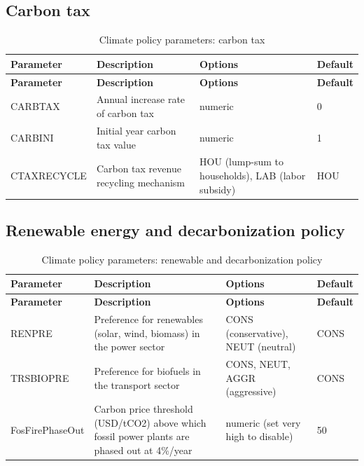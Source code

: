 \documentclass[10pt,a4paper,titlepage,dvipdfmx]{book}
\begin{document}
\subsection{Carbon tax}
\begin{longtable}{|p{}|p{}|p{}|p{}|}
\caption{Climate policy parameters: carbon tax}\label{tab:sp-clp-ctax}\\
\hline
\textbf{Parameter} & \textbf{Description} & \textbf{Options} & \textbf{Default} \\ \hline
\endfirsthead
\hline
\textbf{Parameter} & \textbf{Description} & \textbf{Options} & \textbf{Default} \\ \hline
\endhead
\hline
\endfoot
CARBTAX & Annual increase rate of carbon tax & numeric & 0 \\ \hline
CARBINI & Initial year carbon tax value & numeric & 1 \\ \hline
CTAXRECYCLE & Carbon tax revenue recycling mechanism & HOU (lump-sum to households), LAB (labor subsidy) & HOU \\ \hline
\end{longtable}

\subsection{Renewable energy and decarbonization policy}
\begin{longtable}{|p{}|p{}|p{}|p{}|}
\caption{Climate policy parameters: renewable and decarbonization policy}\label{tab:sp-clp-ren}\\
\hline
\textbf{Parameter} & \textbf{Description} & \textbf{Options} & \textbf{Default} \\ \hline
\endfirsthead
\hline
\textbf{Parameter} & \textbf{Description} & \textbf{Options} & \textbf{Default} \\ \hline
\endhead
\hline
\endfoot
RENPRE & Preference for renewables (solar, wind, biomass) in the power sector & CONS (conservative), NEUT (neutral) & CONS \\ \hline
TRSBIOPRE & Preference for biofuels in the transport sector & CONS, NEUT, AGGR (aggressive) & CONS \\ \hline
FosFirePhaseOut & Carbon price threshold (USD/tCO2) above which fossil power plants are phased out at 4\%/year & numeric (set very high to disable) & 50 \\ \hline
\end{longtable}
\end{document}
